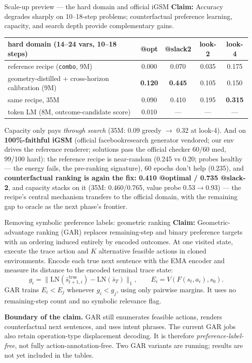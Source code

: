 \documentclass[aspectratio=169,10pt]{beamer}
\newcommand{\claim}[1]{\textcolor{cviolet}{\textbf{Claim:} #1}}
\begin{document}
\begin{frame}{Scale-up preview --- the hard domain and official iGSM}
\claim{Accuracy degrades sharply on 10--18-step problems; counterfactual
preference learning, capacity, and search depth provide complementary gains.}
\centering\small
\begin{tabular}{lcccc}
\toprule
hard domain (14--24 vars, 10--18 steps) & @opt & @slack2 & look-2 & look-4\\
\midrule
reference recipe (\texttt{combo}, 9M) & 0.000 & 0.070 & 0.035 & 0.175\\
geometry-distilled + cross-horizon calibration (9M) & \textbf{0.120} &
 \textbf{0.445} & 0.105 & 0.150\\
same recipe, 35M & 0.090 & 0.410 & 0.195 & \textbf{0.315}\\
token LM (8M, outcome-candidate score) & 0.010 & --- & --- & ---\\
\bottomrule
\end{tabular}

\medskip\small
Capacity only pays \emph{through search} (35M: 0.09 greedy $\to$ 0.32 at
look-4). And on \textbf{100\%-faithful iGSM} (official facebookresearch
generator vendored; our env drives the reference renderer; solutions pass
the official checker 60/60 med, 99/100 hard): the reference recipe is
near-random (0.245 vs 0.20; probes healthy --- the energy fails, the
pre-ranking signature), 60 epochs don't help (0.235), and
\textbf{counterfactual ranking is again the fix: 0.410 @optimal / 0.735
@slack-2}, and capacity stacks on it (35M: 0.460/0.765, value probe
0.53$\to$0.93) --- the recipe's central mechanism transfers to the
official domain, with the remaining gap to oracle as the next phase's
frontier.
\end{frame}

\begin{frame}{Removing symbolic preference labels: geometric ranking}
\claim{Geometric-advantage ranking (GAR) replaces remaining-step and binary
preference targets with an ordering induced entirely by encoded outcomes.}
\small
At one visited state, execute the trace action and $K$ alternative feasible
actions in cloned environments. Encode each true next sentence with the EMA
encoder and measure its distance to the encoded terminal trace state:
\[
g_i=\|\mathrm{LN}(\bar s^{\mathrm{true}}_{t+1,i})-
        \mathrm{LN}(\bar s_T)\|_1,
\qquad E_i=V(F(s_t,a_i),s_0).
\]
GAR trains $E_i<E_j$ whenever $g_i<g_j$, using only pairwise margins. It uses
no remaining-step count and no symbolic relevance flag.

\medskip
\textbf{Boundary of the claim.} GAR still enumerates feasible actions, renders
counterfactual next sentences, and uses intent phrases. The current GAR jobs
also retain operation-type displacement decoding. It is therefore
\emph{preference-label-free}, not fully action-annotation-free. Two GAR variants
are running; results are not yet included in the tables.
\end{frame}
\end{document}
